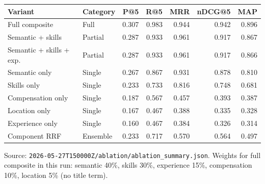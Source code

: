 \caption{Ablation over composite matching components ($K{=}5$).}
\label{tab:ablation}
\begin{tabular}{@{}llrrrrr@{}}
\toprule
Variant & Category & P@5 & R@5 & MRR & nDCG@5 & MAP \\
\midrule
Full composite & Full & 0.307 & 0.983 & 0.944 & 0.942 & 0.896 \\
Semantic + skills & Partial & 0.287 & 0.933 & 0.961 & 0.917 & 0.867 \\
Semantic + skills + exp. & Partial & 0.287 & 0.933 & 0.961 & 0.917 & 0.866 \\
Semantic only & Single & 0.267 & 0.867 & 0.931 & 0.878 & 0.810 \\
Skills only & Single & 0.233 & 0.733 & 0.816 & 0.748 & 0.681 \\
Compensation only & Single & 0.187 & 0.567 & 0.457 & 0.393 & 0.387 \\
Location only & Single & 0.167 & 0.467 & 0.388 & 0.335 & 0.328 \\
Experience only & Single & 0.160 & 0.467 & 0.384 & 0.326 & 0.314 \\
Component RRF & Ensemble & 0.233 & 0.717 & 0.570 & 0.564 & 0.497 \\
\bottomrule
\end{tabular}
\par\vspace{0.4em}
\footnotesize{Source: \texttt{2026-05-27T150000Z/ablation/ablation\_summary.json}. Weights for full composite in this run: semantic 40\%, skills 30\%, experience 15\%, compensation 10\%, location 5\% (no title term). }
